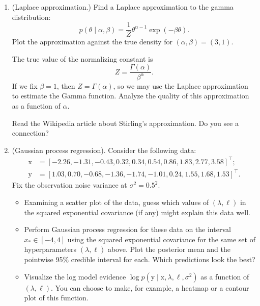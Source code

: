 \documentclass{article}
\newcommand{\given}{\mid}
\renewcommand{\vec}[1]{\bm{\mathrm{#1}}}
\newcommand{\trans}{^\top}
\begin{document}
\begin{enumerate}
\item
  (Laplace approximation.)
  Find a Laplace approximation to the gamma distribution:
  \begin{equation*}
    p(\theta \given \alpha, \beta)
    =
    \frac{1}{Z}
    \theta^{\alpha - 1}
    \exp(-\beta\theta).
  \end{equation*}
  Plot the approximation against the true density for $(\alpha, \beta)
  = (3, 1)$.

  The true value of the normalizing constant is
  \begin{equation*}
    Z = \frac{\Gamma(\alpha)}{\beta^\alpha}.
  \end{equation*}
  If we fix $\beta = 1$, then $Z = \Gamma(\alpha)$, so we may use the
  Laplace approximation to estimate the Gamma function.  Analyze the
  quality of this approximation as a function of $\alpha$.

  Read the Wikipedia article about Stirling's approximation. Do you see
  a connection?

\item
  (Gaussian process regression).
  Consider the following data:
  \begin{align*}
    \vec{x}
    &=
    [-2.26, -1.31, -0.43, 0.32, 0.34, 0.54, 0.86, 1.83, 2.77, 3.58]\trans; \\
    \vec{y}
    &=
    [1.03, 0.70, -0.68, -1.36, -1.74, -1.01, 0.24, 1.55, 1.68, 1.53]\trans.
  \end{align*}
  Fix the observation noise variance at $\sigma^2 = 0.5^2$.

  \begin{itemize}
  \item
    Examining a scatter plot of the data, guess which values of
    $(\lambda, \ell)$ in the squared exponential covariance (if any)
    might explain this data well.
  \item
    Perform Gaussian process regression for these data on the interval
    $x_\ast \in [-4, 4]$ using the squared exponential covariance for
    the same set of hyperparameters $(\lambda, \ell)$ above.  Plot the
    posterior mean and the pointwise 95\% credible interval for each.
    Which predictions look the best?
  \item
    Visualize the log model evidence $\log p(\vec{y} \given \vec{x},
    \lambda, \ell, \sigma^2)$ as a function of $(\lambda, \ell)$.  You
    can choose to make, for example, a heatmap or a contour plot of
    this function.
  \end{itemize}

\end{enumerate}
\end{document}
